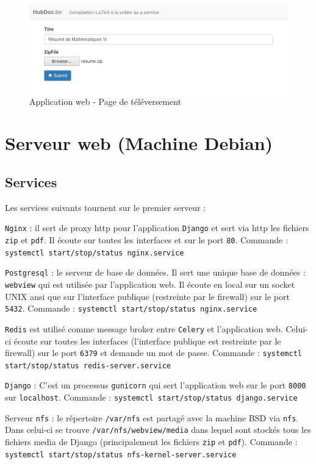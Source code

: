 \documentclass[10pt,a4paper]{article}
\begin{document}
\begin{figure}[!h]
   \centering
   \includegraphics[scale=0.4]{hubdoc-upload.png}
   \caption{\label{app2} Application web - Page de téléversement}
\end{figure}

\section{Serveur web (Machine Debian)}
\subsection{Services}
\label{services}
Les services suivants tournent sur le premier serveur :

\texttt{Nginx} : il sert de proxy http pour l'application \texttt{Django} et sert via http les fichiers \texttt{zip} et \texttt{pdf}.
Il écoute sur toutes les interfaces et sur le port \texttt{80}.
Commande : \texttt{systemctl start/stop/status nginx.service}

\texttt{Postgresql} : le serveur de base de données.
Il sert une unique base de données : \texttt{webview} qui est utilisée par l'application web.
Il écoute en local sur un socket UNIX ansi que sur l'interface publique (restreinte par le firewall) sur le port \texttt{5432}.
Commande : \texttt{systemctl start/stop/status nginx.service}

\texttt{Redis} est utilisé comme message broker entre \texttt{Celery} et l'application web.
Celui-ci écoute sur toutes les interfaces (l'interface publique est restreinte par le firewall) sur le port \texttt{6379} et demande un mot de passe.
Commande : \texttt{systemctl start/stop/status redis-server.service}

\texttt{Django} : C'est un processus \texttt{gunicorn} qui sert l'application web sur le port \texttt{8000} sur \texttt{localhost}.
Commande : \texttt{systemctl start/stop/status django.service}

Serveur \texttt{nfs} : le répertoire \texttt{/var/nfs} est partagé avec la machine BSD via \texttt{nfs}.
Dans celui-ci se trouve \texttt{/var/nfs/webview/media} dans lequel sont stockés tous les fichiers media de Django (principalement les fichiers \texttt{zip} et \texttt{pdf}).
Commande : \texttt{systemctl start/stop/status nfs-kernel-server.service}
\end{document}
